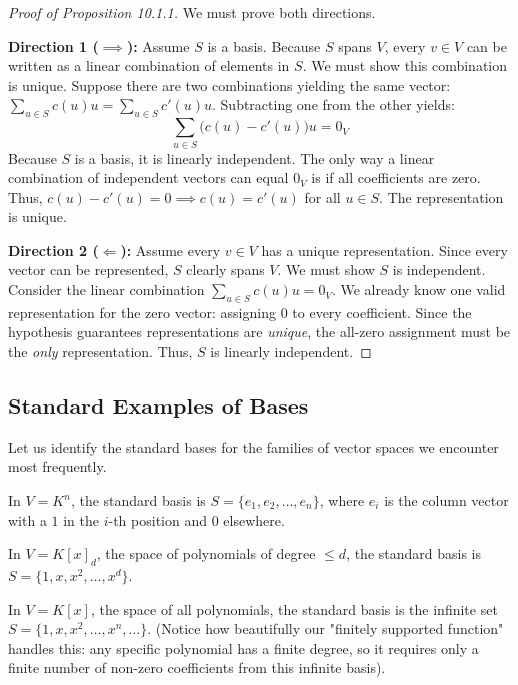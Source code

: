 \begin{proof}[Proof of Proposition 10.1.1]
We must prove both directions.

\textbf{Direction 1 ($\implies$):} Assume $S$ is a basis. Because $S$ spans $V$, every $v \in V$ can be written as a linear combination of elements in $S$. We must show this combination is unique. 
Suppose there are two combinations yielding the same vector: $\sum_{u \in S} c(u) u = \sum_{u \in S} c'(u) u$. 
Subtracting one from the other yields:
\[
\sum_{u \in S} \big(c(u) - c'(u)\big) u = 0_V
\]
Because $S$ is a basis, it is linearly independent. The only way a linear combination of independent vectors can equal $0_V$ is if all coefficients are zero. Thus, $c(u) - c'(u) = 0 \implies c(u) = c'(u)$ for all $u \in S$. The representation is unique.

\textbf{Direction 2 ($\Longleftarrow$):} Assume every $v \in V$ has a unique representation. Since every vector can be represented, $S$ clearly spans $V$. We must show $S$ is independent. 
Consider the linear combination $\sum_{u \in S} c(u) u = 0_V$. We already know one valid representation for the zero vector: assigning $0$ to every coefficient. Since the hypothesis guarantees representations are \textit{unique}, the all-zero assignment must be the \textit{only} representation. Thus, $S$ is linearly independent. 
\end{proof}

\subsection{Standard Examples of Bases}

Let us identify the standard bases for the families of vector spaces we encounter most frequently.

\begin{example}
In $V = K^n$, the standard basis is $S = \{e_1, e_2, \dots, e_n\}$, where $e_i$ is the column vector with a $1$ in the $i$-th position and $0$ elsewhere.
\end{example}

\begin{example}
In $V = K[x]_d$, the space of polynomials of degree $\le d$, the standard basis is $S = \{1, x, x^2, \dots, x^d\}$. 
\end{example}

\begin{example}
In $V = K[x]$, the space of all polynomials, the standard basis is the infinite set $S = \{1, x, x^2, \dots, x^n, \dots\}$. (Notice how beautifully our "finitely supported function" handles this: any specific polynomial has a finite degree, so it requires only a finite number of non-zero coefficients from this infinite basis).
\end{example}


